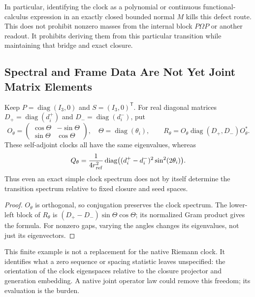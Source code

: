 In particular, identifying the clock as a polynomial or continuous
functional-calculus expression in an exactly closed bounded normal
$M$ kills this defect route. This does not prohibit nonzero masses
from the internal block $P\Omega P$ or another readout. It prohibits
deriving them from this particular transition while maintaining that
bridge and exact closure.

\subsection{Spectral and Frame Data Are Not Yet Joint Matrix Elements}
\label{v480:native-spectral-data}

\begin{proposition}
\label{v480:native-isospectral-freedom}
Keep $P=\operatorname{diag}(I_3,0)$ and
$S=(I_3,0)^{\mathsf T}$. For real diagonal matrices
$D_+=\operatorname{diag}(d_i^+)$ and $D_-=\operatorname{diag}(d_i^-)$,
put
\[
 O_\theta=\begin{pmatrix}\cos\Theta&-\sin\Theta\\
                         \sin\Theta&\cos\Theta\end{pmatrix},
 \quad \Theta=\operatorname{diag}(\theta_i),\qquad
 R_\theta=O_\theta\operatorname{diag}(D_+,D_-)O_\theta^*.
\]
These self-adjoint clocks all have the same eigenvalues, whereas
\[
 Q_\theta=\frac{1}{4r_{\rm ref}^2}
 \operatorname{diag}\bigl((d_i^+-d_i^-)^2\sin^2(2\theta_i)\bigr).
\]
Thus even an exact simple clock spectrum does not by itself determine
the transition spectrum relative to fixed closure and seed spaces.
\end{proposition}
\begin{proof}
$O_\theta$ is orthogonal, so conjugation preserves the clock spectrum.
The lower-left block of $R_\theta$ is
$(D_+-D_-)\sin\Theta\cos\Theta$; its normalized Gram product gives
the formula. For nonzero gaps, varying the angles changes its
eigenvalues, not just its eigenvectors.
\end{proof}

This finite example is not a replacement for the native Riemann clock.
It identifies what a zero sequence or spacing statistic leaves
unspecified: the orientation of the clock eigenspaces relative to
the closure projector and generation embedding. A native joint
operator law could remove this freedom; its evaluation is the burden.

